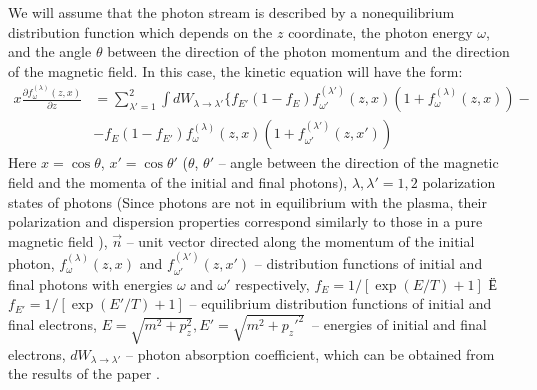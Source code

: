 \documentclass[
aps,%
12pt,%
final,%
notitlepage,%
oneside,%
onecolumn,%
nobibnotes,%
nofootinbib,%
superscriptaddress,%
noshowpacs,%
centertags]%
{revtex4}
\begin{document}
We will assume that the photon stream is described by a nonequilibrium distribution function which depends on the $z$ coordinate, the photon energy $\omega$, and the angle $\theta$ between the direction of the photon momentum and the direction of the magnetic field. In this case, the kinetic equation will have the form:
\begin{equation} 
\begin{aligned}\label{Kineq:Gen}
x\frac{\partial f^{(\lambda)}_\omega(z,x)}{\partial z}&=\sum_{\lambda'=1}^{2} \int dW_{\lambda\to\lambda'}\{f_{E'}(1-f_E)f^{(\lambda')}_{\omega'}(z, x) (1+f_\omega^{(\lambda)}(z, x))-
\\
&-f_E (1-f_{E'}) f_\omega^{(\lambda)}(z,x)(1+f_{\omega'}^{(\lambda')}(z, x'))
\end{aligned}
\end{equation}
Here $x = \cos \theta$, $x' = \cos \theta'$ ($\theta$, $\theta'$ -- angle between the direction of the magnetic field and the momenta of the initial and final photons), $\lambda, \lambda'=1,2$ polarization states of photons (Since photons are not in equilibrium with the plasma, their polarization and dispersion properties correspond similarly to those in a pure magnetic field \cite{Shabad:1988,Rum:2009}),  $\vec{n}$ -- unit vector directed along the momentum of the initial photon, $f^{(\lambda)}_\omega(z, x)$ and  $f^{(\lambda')}_{\omega'}(z, x')$ -- distribution functions of initial and final photons with energies $\omega$ and $ \omega'$ respectively, $f_E = 1/[\exp(E/T)+1]$ Ё $f_{E'} = 1/[\exp(E'/T)+1]$ --  equilibrium distribution functions of initial and final electrons, $E=\sqrt{m^2+p_z^2}, E'=\sqrt{m^2+p_z'^2}$~-- energies of initial and final electrons, $dW_{\lambda \to \lambda'}$ -- photon absorption coefficient, which can be obtained from the results of the paper \cite{YarkovJETP:2017,YarkovJoPCS:2020}.
\end{document}
